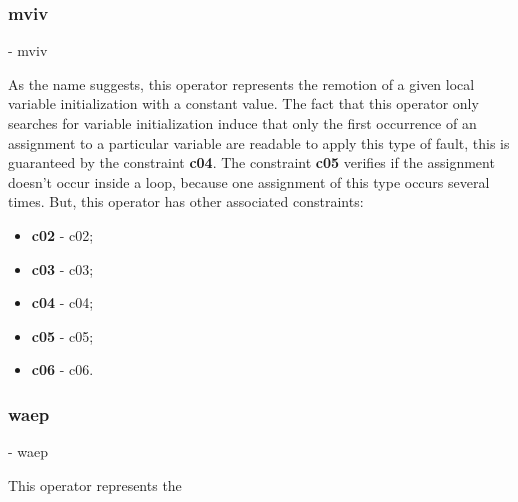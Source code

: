 	\subsubsection{\textbf{\acs{mviv}}} - \Acl{mviv}
	\hypertarget{mviv}{}

	As the name suggests, this operator represents the remotion of a given local variable initialization with a constant value. The fact that this operator only searches for variable initialization induce that only the first occurrence of an assignment to a particular variable are readable to apply this type of fault, this is guaranteed by the constraint \textbf{\acs{c04}}. The constraint \textbf{\acs{c05}} verifies if the assignment doesn't occur inside a loop, because one assignment of this type occurs several times. But, this operator has other associated constraints:

	\begin{itemize}
		\item \textbf{\acs{c02}} - \Acl{c02};
		\item \textbf{\acs{c03}} - \Acl{c03};
		\item \textbf{\acs{c04}} - \Acl{c04};
		\item \textbf{\acs{c05}} - \Acl{c05};
		\item \textbf{\acs{c06}} - \Acl{c06}.
	\end{itemize}




	\subsubsection{\textbf{\acs{waep}}} - \Acl{waep}
	\hypertarget{waep}{}

	This operator represents the


